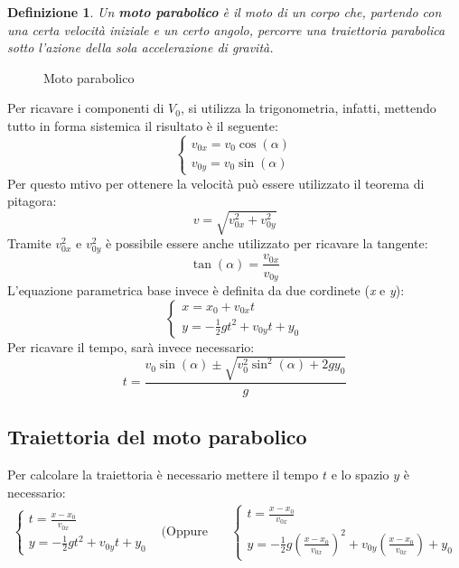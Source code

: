 \documentclass{book}
\newtheorem{defi}{Definizione}[section]
\begin{document}
\begin{defi}
  Un \textbf{moto parabolico} è il moto di un corpo che, partendo con una certa velocità iniziale e un certo angolo, percorre una traiettoria parabolica sotto l'azione della sola accelerazione di gravità.
\end{defi}
\begin{figure}[ht!]
  \centering
  \resizebox{4cm}{!}{
    
  }
  \caption{Moto parabolico}
  \label{fig:motopar}
\end{figure}
Per ricavare i componenti di $V_0$, si utilizza la trigonometria, infatti, mettendo tutto in forma sistemica il risultato è il seguente:
\begin{equation}
  \label{eq:componentixymotopar}
  \begin{cases}
    v_{0x}=v_0\cos(\alpha)\\
    v_{0y}=v_0\sin(\alpha)
  \end{cases}
\end{equation}
Per questo mtivo per ottenere la velocità può essere utilizzato il teorema di pitagora:
\begin{equation*}
  v=\sqrt{v_{0x}^2+v_{0y}^2}
\end{equation*}
Tramite $v_{0x}^2$ e $v_{0y}^2$ è possibile essere anche utilizzato per ricavare la tangente:
\begin{equation*}
  \tan(\alpha)=\frac{v_{0x}}{v_{0y}}
\end{equation*}
L'equazione parametrica base invece è definita da due cordinete (\textit{x} e \textit{y}):
\begin{equation}
  \label{eq:eqbasemotopar}
  \begin{cases}
    x=x_0+v_{0x}t\\
    y=-\frac{1}{2}gt^2+v_{0y}t+y_0
  \end{cases}
\end{equation}
Per ricavare il tempo, sarà invece necessario:
\begin{equation}
  \label{eq:tempomotopar}
  t=\frac{v_0\sin(\alpha)\pm \sqrt{v_0^2\sin^2(\alpha)+2gy_0}}{g}
\end{equation}

\subsection{Traiettoria del moto parabolico}
\label{sec:traietmotopar}

Per calcolare la traiettoria è necessario mettere il tempo $t$ e lo spazio $y$ è necessario:
\begin{eqnarray}
  \label{eq:traietdelmotopar}
  \begin{cases}
    t=\frac{x-x_0}{v_{0x}}\\
    y=-\frac{1}{2}gt^2+v_{0y}t+y_0
  \end{cases} & \text{(Oppure in forma esplicita)} & \begin{cases}
    t=\frac{x-x_0}{v_{0x}}\\
    y=-\frac{1}{2}g\left(\frac{x-x_0}{v_{0x}}\right)^2+v_{0y}\left(\frac{x-x_0}{v_{0x}}\right)+y_0
  \end{cases}
\end{eqnarray}
\end{document}
